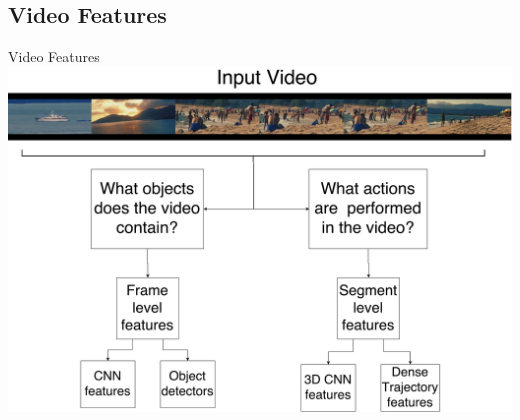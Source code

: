 \documentclass{beamer}
\begin{document}
\subsection{Video Features}
\begin{frame}{Video Features}
    \centering
    \includegraphics[width=1.0\textwidth]{images/VideoFeatures.pdf}
\end{frame}
\end{document}
